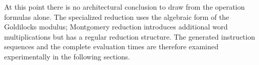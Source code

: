 At this point there is no architectural conclusion to draw from the
operation formulas alone.  The specialized reduction uses the algebraic
form of the Goldilocks modulus; Montgomery reduction introduces additional
word multiplications but has a regular reduction structure.  The generated
instruction sequences and the complete evaluation times are therefore
examined experimentally in the following sections.
